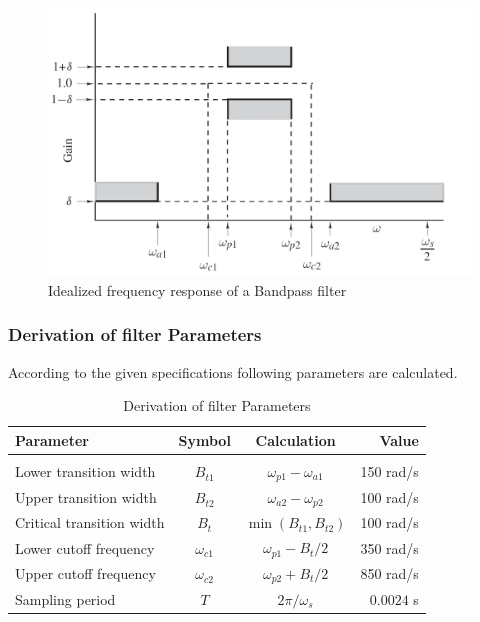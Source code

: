 \documentclass[a4paper,11pt]{article}%
\begin{document}
\begin{figure}[!h]
	\centering
	\includegraphics[scale=0.4]{figures/filtersepecs}
	\caption{Idealized frequency response of a Bandpass filter\cite{antonio}}
\end{figure}
\pagebreak
\subsubsection{Derivation of filter Parameters}

According to the given specifications following parameters are calculated.

\begin{table}[!h]
	\centering
	
\begin{tabular}{l c c r}
	\hline
\textbf{Parameter}& \textbf{Symbol}& \textbf{Calculation}&\textbf{Value}\\\hline
&&&\\
Lower transition width& $B_{t1}$& $\omega_{p1} - \omega_{a1}$&150 rad/s\\
Upper transition width& $B_{t2}$&$\omega_{a2}-\omega_{p2}$&100 rad/s\\
Critical transition width& $B_t$&$\min(B_{t1},B_{t2})$&100 rad/s\\
Lower cutoff frequency& $\omega_{c1}$&$\omega_{p1}-B_t/2$&350 rad/s\\
Upper cutoff frequency& $\omega_{c2}$&$\omega_{p2}+B_t/2 $&850 rad/s \\
Sampling period& $T$& $2\pi / \omega_s$&$0.0024$ s\\
\hline\hline
\end{tabular}
\caption{Derivation of filter Parameters}
\end{table}
\end{document}
